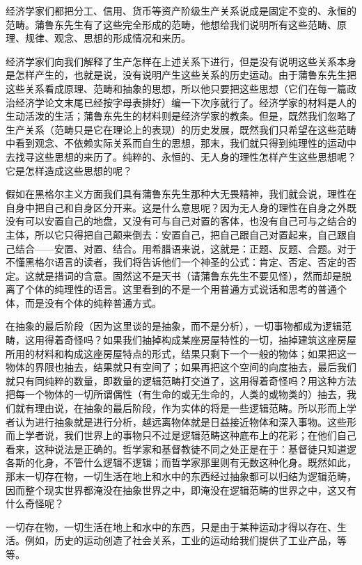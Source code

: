 \documentclass[a4paper,twoside,12pt,AutoFakeBold]{ctexart}
\begin{document}
经济学家们都把分工、信用、货币等资产阶级生产关系说成是固定不变的、永恒的范畴。蒲鲁东先生有了这些完全形成的范畴，他想给我们说明所有这些范畴、原理、规律、观念、思想的形成情况和来历。

经济学家们向我们解释了生产怎样在上述关系下进行，但是没有说明这些关系本身是怎样产生的，也就是说，没有说明产生这些关系的历史运动。由于蒲鲁东先生把这些关系看成原理、范畴和抽象的思想，所以他只要把这些思想（它们在每一篇政治经济学论文末尾已经按字母表排好）编一下次序就行了。经济学家的材料是人的生动活泼的生活；蒲鲁东先生的材料则是经济学家的教条。但是，既然我们忽略了生产关系（范畴只是它在理论上的表现）的历史发展，既然我们只希望在这些范畴中看到观念、不依赖实际关系而自生的思想，那末，我们就只得到纯理性的运动中去找寻这些思想的来历了。纯粹的、永恒的、无人身的理性怎样产生这些思想呢？它是怎样造成这些思想的呢？

假如在黑格尔主义方面我们具有蒲鲁东先生那种大无畏精神，我们就会说，理性在自身中把自己和自身区分开来。这是什么意思呢？因为无人身的理性在自身之外既没有可以安置自己的地盘，又没有可与自己对置的客体，也没有自己可与之结合的主体，所以它只得把自己颠来倒去：安置自己，把自己跟自己对置起来，自己跟自己结合——安置、对置、结合。用希腊语来说，这就是：正题、反题、合题。对于不懂黑格尔语言的读者，我们将告诉他们一个神圣的公式：肯定、否定、否定的否定。这就是措词的含意。固然这不是天书（请蒲鲁东先生不要见怪），然而却是脱离了个体的纯理性的语言。这里看到的不是一个用普通方式说话和思考的普通个体，而是没有个体的纯粹普通方式。

在抽象的最后阶段（因为这里谈的是抽象，而不是分析），一切事物都成为逻辑范畴，这用得着奇怪吗？如果我们抽掉构成某座房屋特性的一切，抽掉建筑这座房屋所用的材料和构成这座房屋特点的形式，结果只剩下一个一般的物体；如果把这一物体的界限也抽去，结果就只有空间了；如果再把这个空间的向度抽去，最后我们就只有同纯粹的数量，即数量的逻辑范畴打交道了，这用得着奇怪吗？用这种方法把每一个物体的一切所谓偶性（有生命的或无生命的，人类的或物类的）抽去，我们就有理由说，在抽象的最后阶段，作为实体的将是一些逻辑范畴。所以形而上学者认为进行抽象就是进行分析，越远离物体就是日益接近物体和深入事物。这些形而上学者说，我们世界上的事物只不过是逻辑范畴这种底布上的花彩；在他们自己看来，这种说法是正确的。哲学家和基督教徒不同之处正是在于：基督徒只知道逻各斯的化身，不管什么逻辑不逻辑；而哲学家那里则有无数这种化身。既然如此，那末一切存在物，一切生活在地上和水中的东西经过抽象都可以归结为逻辑范畴，因而整个现实世界都淹没在抽象世界之中，即淹没在逻辑范畴的世界之中，这又有什么奇怪呢？

一切存在物，一切生活在地上和水中的东西，只是由于某种运动才得以存在、生活。例如，历史的运动创造了社会关系，工业的运动给我们提供了工业产品，等等。
\end{document}

